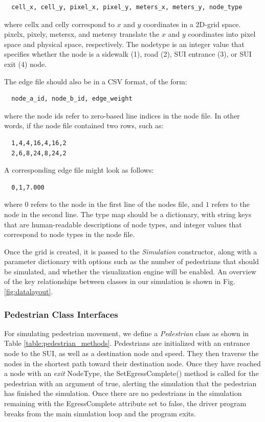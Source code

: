 \documentclass[12pt]{article}
\begin{document}
\begin{lstlisting}
  cell_x, cell_y, pixel_x, pixel_y, meters_x, meters_y, node_type
\end{lstlisting}

where cell\textunderscore x and cell\textunderscore y correspond to $x$ and $y$
coordinates in a 2D-grid space. pixel\textunderscore x, pixel\textunderscore y,
meters\textunderscore x, and meters\textunderscore y translate the $x$ and $y$
coordinates into pixel space and physical space, respectively. The
node\textunderscore type is an integer value that specifies whether the node
is a sidewalk (1), road (2), SUI entrance (3), or SUI exit (4) node.

The edge file should also be in a CSV format, of the form:

\begin{lstlisting}
  node_a_id, node_b_id, edge_weight
\end{lstlisting}

where the node ids refer to zero-based line indices in the node file. In other
words, if the node file contained two rows, such as:

\begin{lstlisting}
  1,4,4,16,4,16,2
  2,6,8,24,8,24,2
\end{lstlisting}

A corresponding edge file might look as follows:

\begin{lstlisting}
  0,1,7.000
\end{lstlisting}

where $0$ refers to the node in the first line of the nodes file, and $1$ refers
to the node in the second line. The type map should be a dictionary, with
string keys that are human-readable descriptions of node types, and integer
values that correspond to node types in the node file.

Once the grid is created, it is passed to the \textit{Simulation} constructor,
along with a parameter dictionary with options such as the number of pedestrians
that should be simulated, and whether the visualization engine will be enabled.
An overview of the key relationships between classes in our simulation is shown
in Fig. \ref{fig:datalayout}.

\subsubsection{Pedestrian Class Interfaces}
For simulating pedestrian movement, we define a \textit{Pedestrian} class as
shown in Table \ref{table:pedestrian_methods}. Pedestrians are initialized with
an entrance node to the SUI, as well as a destination node and speed. They then
traverse the nodes in the shortest path toward their destination node. Once
they have reached a node with an \textit{exit} NodeType, the
SetEgressComplete() method is called for the pedestrian with an argument of
true, alerting the simulation that the pedestrian has finished the simulation.
Once there are no pedestrians in the simulation remaining with the
EgressComplete attribute set to false, the driver program breaks from the main
simulation loop and the program exits.
\end{document}
